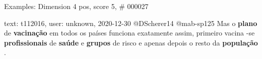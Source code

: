 \begin{frame}{Examples: Dimension 4 pos, score 5, \# 000027}
\footnotesize
\begin{exampleblock}{text: t112016, user: unknown, 2020-12-30}
@DScherer14 @mab-sp125 Mas o \textbf{plano} de \textbf{vacinação} em todos os 
países funciona exatamente assim, primeiro vacina -se \textbf{profissionais} de 
\textbf{saúde} e \textbf{grupos} de risco e apenas depois o resto da 
\textbf{população} . 
\end{exampleblock}
\end{frame}
